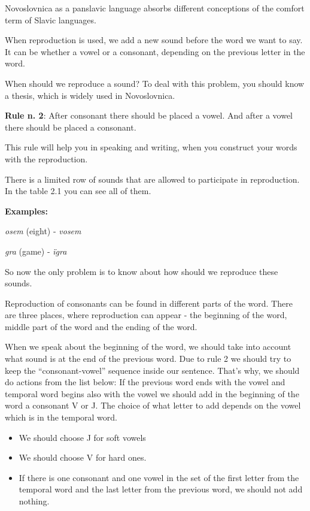 Novoslovnica as a panslavic language absorbs different conceptions of the comfort term of Slavic languages.

When reproduction is used, we add a new sound before the word we want to say. It can be whether a vowel or a consonant, depending on the previous letter in the word.

When should we reproduce a sound? To deal with this problem, you should know a thesis, which is widely used in Novoslovnica.

\textbf{Rule n. 2}: After consonant there should be placed a vowel. And after a vowel there should be placed a consonant.

This rule will help you in speaking and writing, when you construct your words with the reproduction.

There is a limited row of sounds that are allowed to participate in reproduction. In the table 2.1 you can see all of them.

\textbf{Examples:}

\textit{osem} (eight) \textipa{[‘osEm]} - \textit{vosem} \textipa{[‘vosEm]}

\textit{gra} (game) \textipa{[Hra]} - \textit{ïgra} \textipa{[i’Hra]}

So now the only problem is to know about how should we reproduce these sounds.

Reproduction of consonants can be found in different parts of the word. There are three places, where reproduction can appear - the beginning of the word, middle part of the word and the ending of the word.

When we speak about the beginning of the word, we should take into account what sound is at the end of the previous word. Due to rule 2 we should try to keep the “consonant-vowel” sequence inside our sentence. That’s why, we should do actions from the list below:
If the previous word ends with the vowel and temporal word begins also with the vowel we should add in the beginning of the word a consonant V or J. The choice of what letter to add depends on the vowel which is in the temporal word.
\begin{itemize}
	\item We should choose J for soft vowels
	\item We should choose V for hard ones.
	\item If there is one consonant and one vowel in the set of the first letter from the temporal word and the last letter from the previous word, we should not add nothing.
\end{itemize}

